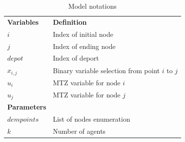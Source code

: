 \documentclass[preprint,review, 11pt,3p,authoryear]{elsarticle}
\newcommand{\rev}{\color{black}} %
\begin{document}
\begin{table}[!htbp]
\centering
\caption{Model notations}
\footnotesize
\label{Indx}
\begin{tabular}{ll}
\textbf{Variables}                   & \textbf{Definition}                                                          \\
$i$                              & Index of initial node \\
$j$                              & Index of ending node \\

$depot$                              & Index of deport \\
$x_{i,j}$                              & Binary variable selection from point $i$ to $j$ \\

$u_{i}$                              & MTZ variable for node $i$ \\
$u_{j}$                              & MTZ variable for node $j$ \\

\textbf{Parameters}              &                                                                              \\
$dempoints$                        & List of nodes enumeration                 \\
$k$                          & Number of agents \\


\end{tabular}
\end{table}
\end{document}
